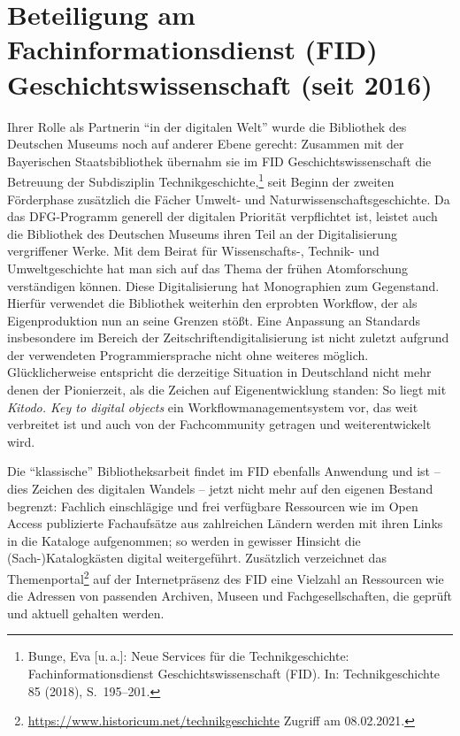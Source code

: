 \documentclass[a4paper,
fontsize=11pt,
oneside,
numbers=noperiodatend,
parskip=half-,
bibliography=totoc,
final
]{scrartcl}
\begin{document}
\hypertarget{beteiligung-am-fachinformationsdienst-fid-geschichtswissenschaft-seit-2016}{%
\section{Beteiligung am Fachinformationsdienst (FID)
Geschichtswissenschaft (seit
2016)}\label{beteiligung-am-fachinformationsdienst-fid-geschichtswissenschaft-seit-2016}}

Ihrer Rolle als Partnerin \enquote{in der digitalen Welt} wurde die
Bibliothek des Deutschen Museums noch auf anderer Ebene gerecht:
Zusammen mit der Bayerischen Staatsbibliothek übernahm sie im FID
Geschichtswissenschaft die Betreuung der Subdisziplin
Technikgeschichte,\footnote{Bunge, Eva {[}u.\,a.{]}: Neue Services für die
  Technikgeschichte: Fachinformationsdienst Geschichtswissenschaft
  (FID). In: Technikgeschichte 85 (2018), S.~195--201.} seit Beginn
der zweiten Förderphase zusätzlich die Fächer Umwelt- und
Naturwissenschaftsgeschichte. Da das DFG-Programm generell der digitalen
Priorität verpflichtet ist, leistet auch die Bibliothek des Deutschen
Museums ihren Teil an der Digitalisierung vergriffener Werke. Mit dem
Beirat für Wissenschafts-, Technik- und Umweltgeschichte hat man sich
auf das Thema der frühen Atomforschung verständigen können. Diese
Digitalisierung hat Monographien zum Gegenstand. Hierfür verwendet die
Bibliothek weiterhin den erprobten Workflow, der als Eigenproduktion nun
an seine Grenzen stößt. Eine Anpassung an Standards insbesondere im
Bereich der Zeitschriftendigitalisierung ist nicht zuletzt aufgrund der
verwendeten Programmiersprache nicht ohne weiteres möglich.
Glücklicherweise entspricht die derzeitige Situation in Deutschland
nicht mehr denen der Pionierzeit, als die Zeichen auf Eigenentwicklung
standen: So liegt mit \emph{Kitodo. Key to digital objects} ein
Workflowmanagementsystem vor, das weit verbreitet ist und auch von der
Fachcommunity getragen und weiterentwickelt wird.

Die \enquote{klassische} Bibliotheksarbeit findet im FID ebenfalls
Anwendung und ist -- dies Zeichen des digitalen Wandels -- jetzt nicht
mehr auf den eigenen Bestand begrenzt: Fachlich einschlägige und frei
verfügbare Ressourcen wie im Open Access publizierte Fachaufsätze aus
zahlreichen Ländern werden mit ihren Links in die Kataloge aufgenommen;
so werden in gewisser Hinsicht die (Sach-)Katalogkästen digital
weitergeführt. Zusätzlich verzeichnet das Themenportal\footnote{\url{https://www.historicum.net/technikgeschichte}
  Zugriff am 08.02.2021.} auf der Internetpräsenz des FID eine Vielzahl
an Ressourcen wie die Adressen von passenden Archiven, Museen und
Fachgesellschaften, die geprüft und aktuell gehalten werden.
\end{document}
